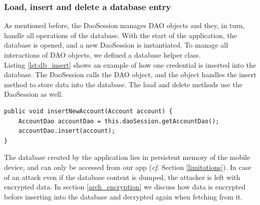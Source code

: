 \subsubsection*{Load, insert and delete a database entry}
As mentioned before, the DaoSession manages DAO objects and they, in turn, handle all operations of the database. With the start of the application, the database is opened, and a new DaoSession is instantiated. To manage all interactions of DAO objects, we defined a database helper class. \\
Listing \ref{lst:db_insert} shows an example of how one credential is inserted into the database. The DaoSession calls the DAO object, and the object handles the insert method to store data into the database. The load and delete methods use the DaoSession as well. 

\begin{lstlisting}[float,floatplacement=h, caption= Insert Entry into Database, label=lst:db_insert]
public void insertNewAccount(Account account) {
    AccountDao accountDao = this.daoSession.getAccountDao();
    accountDao.insert(account);
}
\end{lstlisting}
\vspace{0.5cm}

The database created by the application lies in persistent memory of the mobile device, and can only be accessed from our app (\textit{cf.} Section \ref{limitations}). In case of an attack even if the database content is dumped, the attacker is left with encrypted data. In section \ref{arch_encryption} we discuss how data is encrypted before inserting into the database and decrypted again when fetching from it. \\


